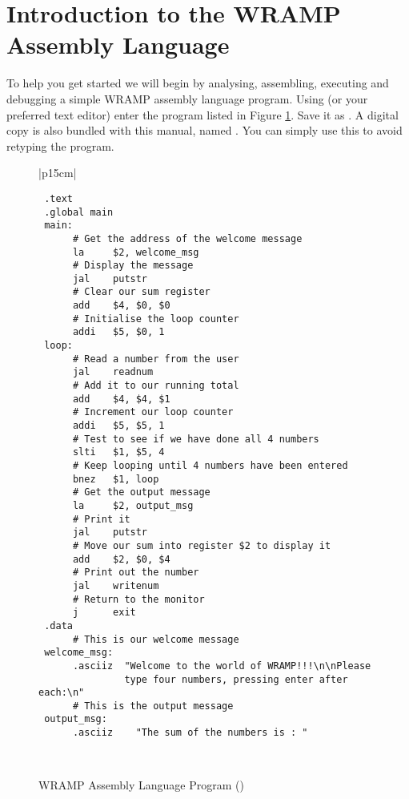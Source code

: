 \section{Introduction to the WRAMP Assembly Language}
%
To help you get started we will begin by analysing, assembling,
executing and debugging a simple WRAMP assembly language program.
Using  (or your preferred text editor) enter the
program listed in Figure \ref{simple_prog}. Save it as .
A digital copy is also bundled with this manual, named .
You can simply use this to avoid retyping the program.

%
%
\begin{figure}[btp]
\begin{center}
\begin{tabular}{|p{15cm}|}
\hline
\begin{verbatim}
 .text
 .global main
 main:
      # Get the address of the welcome message
      la     $2, welcome_msg
      # Display the message
      jal    putstr
      # Clear our sum register
      add    $4, $0, $0
      # Initialise the loop counter
      addi   $5, $0, 1
 loop:
      # Read a number from the user
      jal    readnum
      # Add it to our running total
      add    $4, $4, $1
      # Increment our loop counter
      addi   $5, $5, 1
      # Test to see if we have done all 4 numbers
      slti   $1, $5, 4
      # Keep looping until 4 numbers have been entered
      bnez   $1, loop
      # Get the output message
      la     $2, output_msg
      # Print it
      jal    putstr
      # Move our sum into register $2 to display it
      add    $2, $0, $4
      # Print out the number
      jal    writenum
      # Return to the monitor
      j      exit
 .data
      # This is our welcome message
 welcome_msg:
      .asciiz  "Welcome to the world of WRAMP!!!\n\nPlease
               type four numbers, pressing enter after each:\n"
      # This is the output message
 output_msg:
      .asciiz    "The sum of the numbers is : "
\end{verbatim}%

\\
\hline
\end{tabular}
\end{center}
\caption{WRAMP Assembly Language Program ()}
\label{simple_prog}
\end{figure}
%

